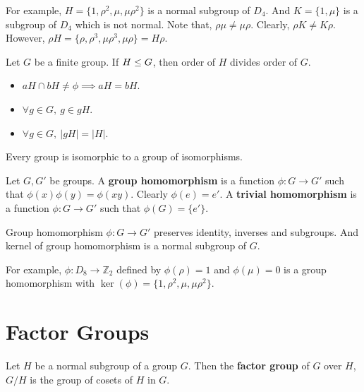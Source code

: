 \begin{remark}
	For example, $H = \{1,\rho^2,\mu,\mu\rho^2\}$ is a normal subgroup of $D_4$.
	And $K = \{1,\mu\}$ is a subgroup of $D_4$ which is not normal.
	Note that, $\rho\mu \ne \mu\rho$.
	Clearly, $\rho K \ne K\rho$.
	However, $\rho H = \{ \rho, \rho^3, \mu\rho^3, \mu\rho \} = H\rho$.
\end{remark}

\begin{remark}%
	Let $G$ be a finite group.
	If $H \le G$, then order of $H$ divides order of $G$.
\end{remark}
\begin{itemize}
	\item $aH \cap bH \ne \phi \implies aH = bH$.
	\item $\forall g \in G,\ g \in gH$.
	\item $\forall g \in G,\ |gH| = |H|$.
\end{itemize}

\begin{remark}%
	Every group is isomorphic to a group of isomorphisms.
\end{remark}

\begin{definition}
	Let $G,G'$ be groups.
	A \textbf{group homomorphism} is a function $\phi : G \to G'$ such that $\phi(x)\phi(y) = \phi(xy)$.
	Clearly $\phi(e) = e'$.
	A \textbf{trivial homomorphism} is a function $\phi : G \to G'$ such that $\phi(G) = \{ e' \}$.
\end{definition}


\begin{remark}
	Group homomorphism $\phi : G \to G'$ preserves identity, inverses and subgroups.
	And kernel of group homomorphism is a normal subgroup of $G$.%
\end{remark}
\begin{remark}
	For example, $\phi : D_8 \to \mathbb{Z}_2$ defined by $\phi(\rho) = 1$ and $\phi(\mu) = 0$ is a group homomorphism with $\ker(\phi) = \{ 1,\rho^2,\mu,\mu\rho^2 \}$.
\end{remark}

\section{Factor Groups}
\begin{remark}
	Let $H$ be a normal subgroup of a group $G$.
	Then the \textbf{factor group} of $G$ over $H$, $G/H$ is the group of cosets of $H$ in $G$.
\end{remark}

